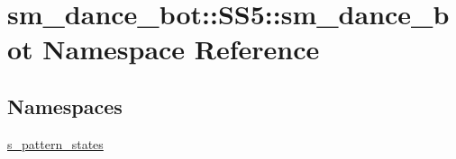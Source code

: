 \hypertarget{namespacesm__dance__bot_1_1SS5_1_1sm__dance__bot}{}\section{sm\+\_\+dance\+\_\+bot\+:\+:S\+S5\+:\+:sm\+\_\+dance\+\_\+bot Namespace Reference}
\label{namespacesm__dance__bot_1_1SS5_1_1sm__dance__bot}
\subsection*{Namespaces}
\begin{DoxyCompactItemize}
\item 
 \hyperlink{namespacesm__dance__bot_1_1SS5_1_1sm__dance__bot_1_1s__pattern__states}{s\+\_\+pattern\+\_\+states}
\end{DoxyCompactItemize}
